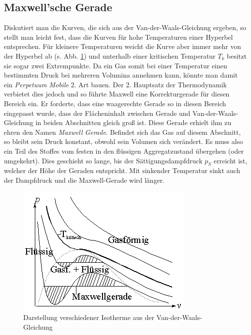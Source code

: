 \documentclass[12pt,a4paper,titlepage,headinclude,bibtotoc]{scrartcl}
\begin{document}
\subsection{Maxwell'sche Gerade}
Diskutiert man die Kurven, die sich aus der Van-der-Waals-Gleichung ergeben, so stellt man leicht fest, dass die Kurven für hohe Temperaturen einer Hyperbel entsprechen.
Für kleinere Temperaturen weicht die Kurve aber immer mehr von der Hyperbel ab (s. Abb. \ref{fig:vanderwaalskurven}) und unterhalb einer kritischen Temperatur $T_k$ besitzt sie sogar zwei Extrempunkte.
Da ein Gas somit bei einer Temperatur einen bestimmten Druck bei mehreren Volumina annehmen kann, könnte man damit ein \emph{Perpetuum Mobile} 2. Art bauen.
Der 2. Hauptsatz der Thermodynamik verbietet dies jedoch und so führte Maxwell eine Korrekturgerade für diesen Bereich ein.
Er forderte, dass eine waagerechte Gerade so in diesen Bereich eingepasst wurde, dass der Flächeninhalt zwischen Gerade und Van-der-Waals-Gleichung in beiden Abschnitten gleich groß ist.
Diese Gerade erhielt ihm zu ehren den Namen \emph{Maxwell Gerade}.
Befindet sich das Gas auf diesem Abschnitt, so bleibt sein Druck konstant, obwohl sein Volumen sich verändert.
Es muss also ein Teil des Stoffes vom festen in den flüssigen Aggregatzustand übergehen (oder umgekehrt).
Dies geschieht so lange, bis der Sättigungsdampfdruck $p_S$ erreicht ist, welcher der Höhe der Geraden entspricht.
Mit sinkender Temperatur sinkt auch der Dampfdruck und die Maxwell-Gerade wird länger.
\begin{figure}[!h]
	\centering
\includegraphics{vanwaalsiso}
	\caption{Darstellung verschiedener Isotherme aus der Van-der-Waals-Gleichung}
	\label{fig:vanderwaalskurven}
\end{figure}
\end{document}
